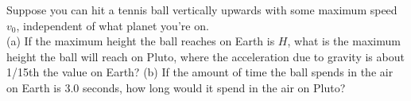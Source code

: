 Suppose you can hit a tennis ball vertically upwards with some maximum
speed $v_0$, independent of what planet you're on.\\
(a) If the maximum height the ball reaches on Earth is $H$, what is
the maximum height the ball will reach on Pluto, where the
acceleration due to gravity is about 1/15th the value on Earth?\hwendpart
(b) If the amount of time the ball spends in the air on Earth is 3.0
seconds, how long would it spend in the air on Pluto?
